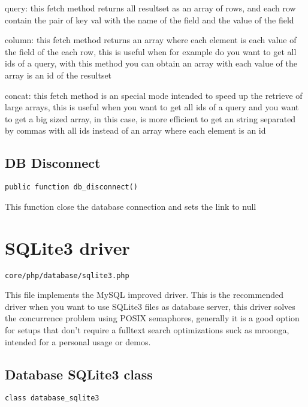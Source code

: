 \documentclass[a4paper]{book}
\begin{document}
query: this fetch method returns all resultset as an array of rows, and each row contain the
pair of key val with the name of the field and the value of the field

column: this fetch method returns an array where each element is each value of the field of
the each row, this is useful when for example do you want to get all ids of a query, with
this method you can obtain an array with each value of the array is an id of the resultset

concat: this fetch method is an special mode intended to speed up the retrieve of large
arrays, this is useful when you want to get all ids of a query and you want to get a big
sized array, in this case, is more efficient to get an string separated by commas with all
ids instead of an array where each element is an id

\hypertarget{toc343}{}
\subsection{DB Disconnect}

\begin{lstlisting}
public function db_disconnect()
\end{lstlisting}

This function close the database connection and sets the link to null

\hypertarget{toc344}{}
\section{SQLite3 driver}

\begin{lstlisting}
core/php/database/sqlite3.php
\end{lstlisting}

This file implements the MySQL improved driver. This is the recommended driver when you want
to use SQLite3 files as database server, this driver solves the concurrence problem using
POSIX semaphores, generally it is a good option for setups that don't require a fulltext
search optimizations suck as mroonga, intended for a personal usage or demos.

\hypertarget{toc345}{}
\subsection{Database SQLite3 class}

\begin{lstlisting}
class database_sqlite3
\end{lstlisting}
\end{document}
